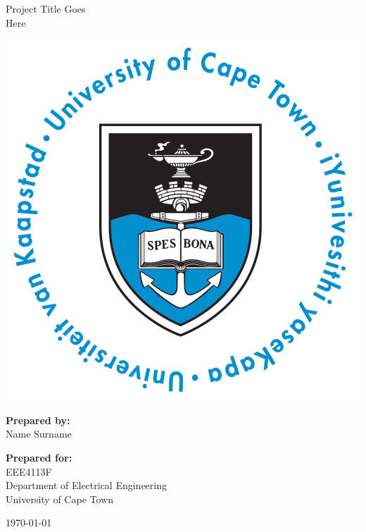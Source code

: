 \thispagestyle{empty}
\begin{center}
    
\Huge

\vspace{5cm}

Project Title Goes\\Here

\vspace{1.5cm}

\includegraphics[width=0.6\linewidth]{FrontMatter/UCT_logo.png}

\vspace{1.5cm}

\large
\textbf{Prepared by:}\\
Name Surname

\vspace{1cm}

\textbf{Prepared for:}\\
EEE4113F\\
Department of Electrical Engineering\\
University of Cape Town

\vspace{2cm}

\today


\end{center}